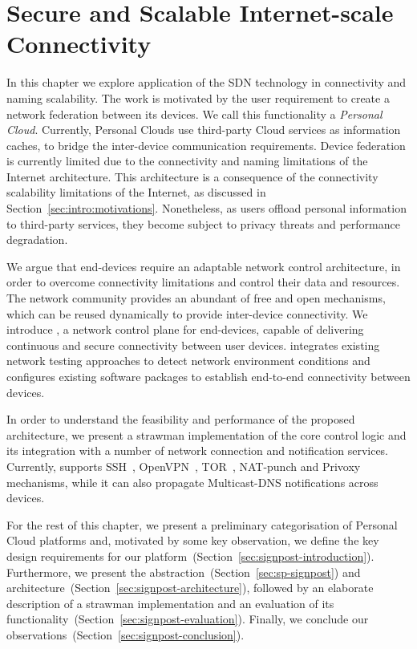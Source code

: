 \chapter{Secure and Scalable Internet-scale Connectivity}
\label{sec:signpost}
\ifpdf
    \graphicspath{{Chapter3/Chapter3Figs/PNG/}{Chapter3/Chapter3Figs/PDF/}{Chapter3/Chapter3Figs/}}
\else
   \graphicspath{{Chapter3/Chapter3Figs/EPS/}{Chapter3/Chapter3Figs/}}
\fi

In this chapter we explore application of the SDN technology in connectivity and
naming scalability.  The work is motivated by the user requirement to create a
network federation between its devices.  We call this functionality a
\emph{Personal Cloud}.  Currently, Personal Clouds use third-party Cloud
services as information caches, to bridge the inter-device communication
requirements. Device federation is currently limited due to the connectivity and
naming limitations of the Internet architecture.  This architecture is a
consequence of the connectivity scalability limitations of the Internet, as
discussed in Section~\ref{sec:intro:motivations}. Nonetheless, as users offload
personal information to third-party services, they become subject to privacy
threats and performance degradation.

We argue that end-devices require an adaptable network control architecture, in
order to overcome  connectivity limitations and control their data and
resources.  The network community provides an abundant of free and open
mechanisms, which can be reused dynamically to provide inter-device
connectivity.  We introduce \signpost, a network control plane for end-devices,
capable of delivering continuous and secure connectivity between user devices.
\signpost integrates existing network testing approaches to detect network
environment conditions and configures existing software packages to establish
end-to-end connectivity between devices. 

In order to understand the feasibility and performance of the proposed
architecture, we present a strawman implementation of the core control logic and
its integration with a number of network connection and notification services.
Currently, \signpost supports SSH~, OpenVPN~,
TOR~, NAT-punch and Privoxy~ 
mechanisms, while it can also propagate Multicast-DNS notifications across
devices.

For the rest of this chapter, we present a preliminary categorisation of
Personal Cloud platforms and, motivated by some key observation, we define the
key design requirements for our
platform~(Section~\ref{sec:signpost-introduction}). Furthermore, we present the
\signpost abstraction~(Section~\ref{sec:sp-signpost}) and
architecture~(Section~\ref{sec:signpost-architecture}), followed by an elaborate
description of a strawman \signpost implementation and an evaluation of its
functionality~(Section~\ref{sec:signpost-evaluation}).  Finally, we conclude our
observations~(Section~\ref{sec:signpost-conclusion}).

